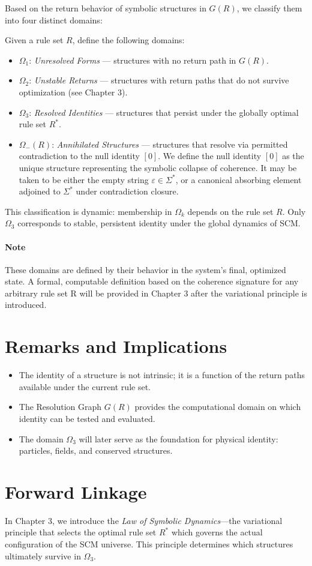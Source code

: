 Based on the return behavior of symbolic structures in $G(R)$, we classify them into four distinct domains:

\begin{definition}
Given a rule set $R$, define the following domains:
\begin{itemize}
    \item $\Omega_1$: \emph{Unresolved Forms} — structures with no return path in $G(R)$.
    \item $\Omega_2$: \emph{Unstable Returns} — structures with return paths that do not survive optimization (see Chapter 3).
    \item $\Omega_3$: \emph{Resolved Identities} — structures that persist under the globally optimal rule set $R^*$.
    \item $\Omega_{-}(R)$: \emph{Annihilated Structures} — structures that resolve via permitted contradiction to the null identity $[0]$. We define the null identity $[0]$ as the unique structure representing the symbolic collapse of coherence. It may be taken to be either the empty string $\varepsilon \in \Sigma^*$, or a canonical absorbing element adjoined to $\Sigma^*$ under contradiction closure.
\end{itemize}
\end{definition}

\noindent
This classification is dynamic: membership in $\Omega_k$ depends on the rule set $R$. Only $\Omega_3$ corresponds to stable, persistent identity under the global dynamics of SCM.

\paragraph{Note}
These domains are defined by their behavior in the system's final, optimized state. A formal, computable definition based on the coherence signature for any arbitrary rule set R will be provided in Chapter 3 after the variational principle is introduced.

\section{Remarks and Implications}

\begin{itemize}
    \item The identity of a structure is not intrinsic; it is a function of the return paths available under the current rule set.
    \item The Resolution Graph $G(R)$ provides the computational domain on which identity can be tested and evaluated.
    \item The domain $\Omega_3$ will later serve as the foundation for physical identity: particles, fields, and conserved structures.
\end{itemize}

\section{Forward Linkage}

In Chapter 3, we introduce the \emph{Law of Symbolic Dynamics}—the variational principle that selects the optimal rule set $R^*$ which governs the actual configuration of the SCM universe. This principle determines which structures ultimately survive in $\Omega_3$.
